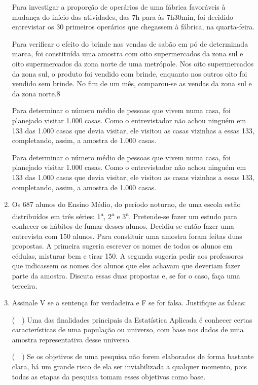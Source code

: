 \begin{enumerate}
	\subitem Para investigar a proporção de operários de uma fábrica favoráveis à mudança do
início das atividades, das 7h para às 7h30min, foi decidido entrevistar os 30 primeiros
operários que chegassem à fábrica, na quarta-feira.
	
	\subitem Para verificar o efeito do brinde nas vendas de sabão em pó de determinada marca,
foi constituída uma amostra com oito supermercados da zona sul e oito
supermercados da zona norte de uma metrópole. Nos oito supermercados da zona
sul, o produto foi vendido com brinde, enquanto nos outros oito foi vendido sem
brinde. No fim de um mês, comparou-se as vendas da zona sul e da zona norte.8
	
	\subitem Para determinar o número médio de pessoas que vivem numa casa, foi planejado
visitar 1.000 casas. Como o entrevistador não achou ninguém em 133 das 1.000
casas que devia visitar, ele visitou as casas vizinhas a essas 133, completando,
assim, a amostra de 1.000 casas.
	
	\subitem Para determinar o número médio de pessoas que vivem numa casa, foi planejado
visitar 1.000 casas. Como o entrevistador não achou ninguém em 133 das 1.000
casas que devia visitar, ele visitou as casas vizinhas a essas 133, completando,
assim, a amostra de 1.000 casas.
	
	\item Os 687 alunos do Ensino Médio, do período noturno, de uma escola estão distribuídos
em três séries: 1\textsuperscript{a}, 2\textsuperscript{a} e 3\textsuperscript{a}. Pretende-se fazer um estudo para conhecer os hábitos de fumar
desses alunos. Decidiu-se então fazer uma entrevista com 150 alunos. Para constituir uma
amostra foram feitas duas propostas. A primeira sugeria escrever os nomes de todos os
alunos em cédulas, misturar bem e tirar 150. A segunda sugeria pedir aos professores que
indicassem os nomes dos alunos que eles achavam que deveriam fazer parte da amostra.
Discuta essas duas propostas e, se for o caso, faça uma terceira.
	
	\item Assinale V se a sentença for verdadeira e F se for falsa. Justifique as falsas:
	
	
	\subitem (~~) Uma das finalidades principais da Estatística Aplicada é conhecer certas
	características de uma população ou universo, com base nos dados de uma amostra
	representativa desse universo.
	
	
	\subitem (~~) Se os objetivos de uma pesquisa não forem elaborados de forma bastante clara, há
um grande risco de ela ser inviabilizada a qualquer momento, pois todas as etapas
da pesquisa tomam esses objetivos como base.
	

\end{enumerate}
